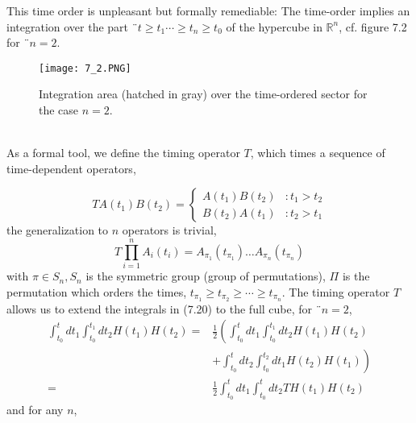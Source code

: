This time order is unpleasant but formally remediable: The time-order implies an integration over the part ¨$t\geq t_1\cdots \geq t_n \geq t_0$ of the hypercube in $\mathbb{R}^n$, cf. figure 7.2 for ¨$n = 2$.
\begin{figure}[ht]
    \begin{minipage}{0.5\textwidth}
        \centering
        \texttt{[image: 7\_2.PNG]}
    \end{minipage}
    \begin{minipage}{0.5\textwidth}
        \caption{Integration area (hatched in gray) over the time-ordered sector for the case $n = 2$.}
    \end{minipage}
\end{figure}
\\
As a formal tool, we define the timing operator $T$, which times a sequence of time-dependent operators,

\begin{equation}
T A\left(t_{1}\right) B\left(t_{2}\right)=\left\{\begin{array}{ll}{A\left(t_{1}\right) B\left(t_{2}\right)} & {: t_{1}>t_{2}} \\ {B\left(t_{2}\right) A\left(t_{1}\right)} & {: t_{2}>t_{1}}\end{array}\right.
\end{equation}
the generalization to $n$ operators is trivial,
\begin{equation}
    T \prod_{i=1}^{n} A_{i}\left(t_{i}\right)=A_{\pi_{1}}\left(t_{\pi_{1}}\right) \ldots A_{\pi_{n}}\left(t_{\pi_{n}}\right)
    \end{equation}
with $\pi\in S_n, S_n$ is the symmetric group (group of permutations), $\Pi$ is the permutation which orders the times, $t_{\pi_1}\geq t_{\pi_2}\geq \cdots \geq t_{\pi_n}$. The timing operator $T$ allows us to extend the integrals in (7.20) to the full cube, for ¨$n = 2$,
\begin{equation}
\begin{aligned} \int_{t_{0}}^{t} d t_{1} \int_{t_{0}}^{t_{1}} d t_{2} H\left(t_{1}\right) H\left(t_{2}\right)=& \frac{1}{2}\left(\int_{t_{0}}^{t} d t_{1} \int_{t_{0}}^{t_{1}} d t_{2} H\left(t_{1}\right) H\left(t_{2}\right)\right.\\ &\left.+\int_{t_{0}}^{t} d t_{2} \int_{t_{0}}^{t_{2}} d t_{1} H\left(t_{2}\right) H\left(t_{1}\right)\right) \\=& \frac{1}{2} \int_{t_{0}}^{t} d t_{1} \int_{t_{0}}^{t} d t_{2} T H\left(t_{1}\right) H\left(t_{2}\right) \end{aligned}
\end{equation}
and for any $n$,

